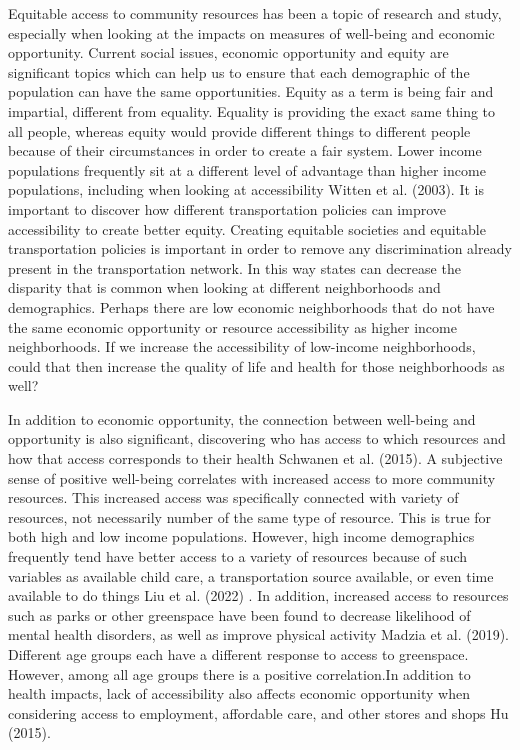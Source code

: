 \documentclass[
  letterpaper,
  DIV=11,
  numbers=noendperiod]{scrreport}
\begin{document}
Equitable access to community resources has been a topic of research and
study, especially when looking at the impacts on measures of well-being
and economic opportunity. Current social issues, economic opportunity
and equity are significant topics which can help us to ensure that each
demographic of the population can have the same opportunities. Equity as
a term is being fair and impartial, different from equality. Equality is
providing the exact same thing to all people, whereas equity would
provide different things to different people because of their
circumstances in order to create a fair system. Lower income populations
frequently sit at a different level of advantage than higher income
populations, including when looking at accessibility Witten et al.
(2003). It is important to discover how different transportation
policies can improve accessibility to create better equity. Creating
equitable societies and equitable transportation policies is important
in order to remove any discrimination already present in the
transportation network. In this way states can decrease the disparity
that is common when looking at different neighborhoods and demographics.
Perhaps there are low economic neighborhoods that do not have the same
economic opportunity or resource accessibility as higher income
neighborhoods. If we increase the accessibility of low-income
neighborhoods, could that then increase the quality of life and health
for those neighborhoods as well?

In addition to economic opportunity, the connection between well-being
and opportunity is also significant, discovering who has access to which
resources and how that access corresponds to their health Schwanen et
al. (2015). A subjective sense of positive well-being correlates with
increased access to more community resources. This increased access was
specifically connected with variety of resources, not necessarily number
of the same type of resource. This is true for both high and low income
populations. However, high income demographics frequently tend have
better access to a variety of resources because of such variables as
available child care, a transportation source available, or even time
available to do things Liu et al. (2022) . In addition, increased access
to resources such as parks or other greenspace have been found to
decrease likelihood of mental health disorders, as well as improve
physical activity Madzia et al. (2019). Different age groups each have a
different response to access to greenspace. However, among all age
groups there is a positive correlation.In addition to health impacts,
lack of accessibility also affects economic opportunity when considering
access to employment, affordable care, and other stores and shops Hu
(2015).
\end{document}
